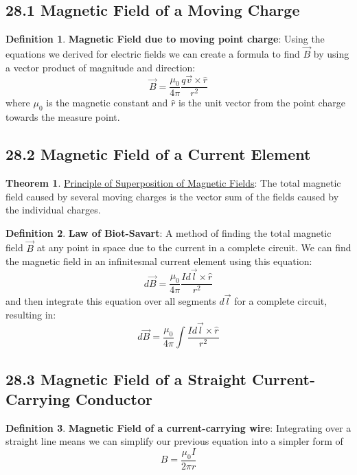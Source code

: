 \documentclass[12pt]{amsart}
\theoremstyle{definition}
\newtheorem{theorem}{Theorem}  %
\newtheorem{definition}{Definition} %
\numberwithin{equation}{theorem}    %
\begin{document}
\subsection*{28.1 Magnetic Field of a Moving Charge}

\begin{definition}
    \textbf{Magnetic Field due to moving point charge}:
    Using the equations we derived for electric fields we can create a formula
    to find $\vec{B}$ by using a vector product of magnitude and direction:
    $$\vec{B} = \frac{\mu_0}{4\pi}\frac{q\vec{v}\times \hat{r}}{r^2}$$
    where $\mu_0$ is the magnetic constant and $\hat{r}$ is the unit vector from the point charge towards the measure point.
\end{definition}

\subsection*{28.2 Magnetic Field of a Current Element}
\begin{theorem}
    \underline{Principle of Superposition of Magnetic Fields}:
    The total magnetic field caused by several moving charges is the vector sum of the fields caused by the individual charges.
\end{theorem}

\begin{definition}
    \textbf{Law of Biot-Savart}:
    A method of finding the total magnetic field $\vec{B}$ at any point in space due to the current in a complete circuit. We can find the magnetic field in an infinitesmal current element using this equation:
    $$d\vec{B}= \frac{\mu_0}{4\pi} \frac{Id\vec{l}\times\hat{r}}{r^2}$$ and then integrate this equation over all segments $d\vec{l}$ for a complete circuit, resulting in:
    $$d\vec{B}= \frac{\mu_0}{4\pi} \int \frac{Id\vec{l}\times\hat{r}}{r^2}$$
\end{definition}

\subsection*{28.3 Magnetic Field of a Straight Current-Carrying Conductor}

\begin{definition}
    \textbf{Magnetic Field of a current-carrying wire}:
    Integrating over a straight line means we can simplify our previous equation into a simpler form of $$B = \frac{\mu_0I}{2\pi r}$$
\end{definition}
\end{document}

